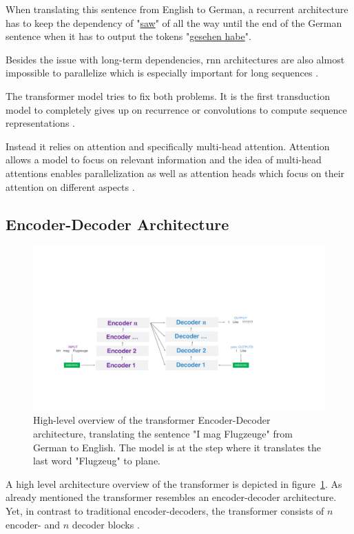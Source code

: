 When translating this sentence from English to German, a recurrent architecture has to keep the dependency of "\underline{saw}" of all the way until the end of the German sentence when it has to output the tokens "\underline{gesehen habe}".
\medskip

Besides the issue with long-term dependencies, \gls{rnn} architectures are also almost impossible to parallelize which is especially important for long sequences \cite{Vaswani2017d}.
\medskip

The transformer model tries to fix both problems. It is the first transduction model to completely gives up on recurrence or convolutions to compute sequence representations \cite{Vaswani2017d}. 

Instead it relies on attention and specifically multi-head attention. Attention allows a model to focus on relevant information and the idea of multi-head attentions enables parallelization as well as attention heads which focus on their attention on different aspects \cite{Vaswani2017d}.

\subsection{Encoder-Decoder Architecture}

\begin{figure}[htp]
	\centering
	\includegraphics[width=\textwidth]{figures/03_theory/03_transformer_Architecture_HighLevel}
	\caption{High-level overview of the transformer Encoder-Decoder architecture, translating the sentence "I mag Flugzeuge" from German to English. The model is at the step where it translates the last word "Flugzeug" to plane.}
	\label{fig:03_transformer_HighlevelOverview}
\end{figure}

A high level architecture overview of the transformer is depicted in figure~\ref{fig:03_transformer_HighlevelOverview}. As already mentioned the transformer resembles an encoder-decoder architecture. Yet, in contrast to traditional encoder-decoders, the transformer consists of $n$ encoder- and $n$ decoder blocks \cite{Vaswani2017d}. 
\medskip

